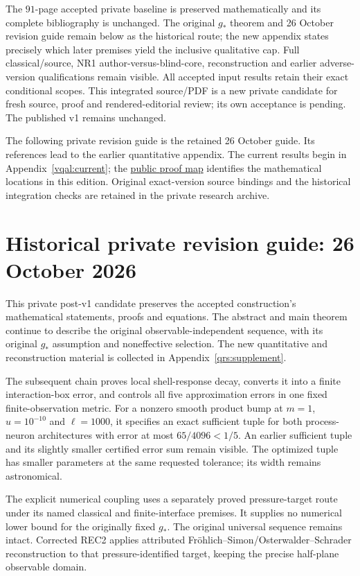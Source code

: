 \documentclass[11pt]{article}
\theoremstyle{plain}
\theoremstyle{definition}
\theoremstyle{remark}
\begin{document}
The $91$-page accepted private baseline is preserved mathematically and
its complete bibliography is unchanged. The original $g_*$ theorem and
26 October revision guide remain below as the historical route; the
new appendix states precisely which later premises yield the inclusive
qualitative cap. Full classical/source, NR1 author-versus-blind-core,
reconstruction and earlier adverse-version qualifications remain visible.
All accepted input results retain their exact conditional scopes. This
integrated source/PDF is a new private candidate for fresh source, proof and
rendered-editorial review; its own acceptance is pending.
The published v1 remains unchanged.

The following private revision guide is the retained 26 October guide.
Its references lead to the earlier quantitative appendix. The current
results begin in Appendix~\ref{vqal:current}; the
\href{run:PROOF-MAP.md}{public proof map} identifies the mathematical locations
in this edition. Original exact-version source bindings and the historical
integration checks are retained in the private research archive.

\clearpage
\section*{Historical private revision guide: 26 October 2026}
\label{qrs:guide}

This private post-v1 candidate preserves the accepted construction's
mathematical statements, proofs and equations. The abstract and main theorem
continue to describe the original observable-independent sequence, with its
original $g_*$ assumption and noneffective selection. The new quantitative
and reconstruction material is collected in Appendix~\ref{qrs:supplement}.

The subsequent chain proves local shell-response decay, converts it into a
finite interaction-box error, and controls all five approximation errors in
one fixed finite-observation metric. For a nonzero smooth product bump at
$m=1$, $u=10^{-10}$ and $\ell=1000$, it specifies an exact sufficient tuple
for both process-neuron architectures with error at most $65/4096<1/5$.
An earlier sufficient tuple and its slightly smaller certified error sum
remain visible. The optimized tuple has smaller parameters at the same
requested tolerance; its width remains astronomical.

The explicit numerical coupling uses a separately proved pressure-target
route under its named classical and finite-interface premises. It supplies
no numerical lower bound for the originally fixed $g_*$. The original
universal sequence remains intact. Corrected REC2 applies attributed
Fr\"ohlich--Simon/Osterwalder--Schrader reconstruction to that
pressure-identified target, keeping the precise half-plane observable domain.
\end{document}
